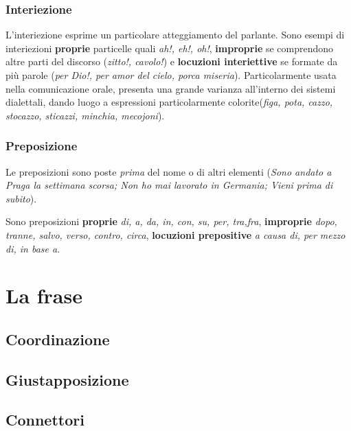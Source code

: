 \documentclass[a4paper,twoside,11pt,chapterprefix=false,bibliography=totocnumbered,listof=flat]{scrbook}
\begin{document}
\hypertarget{interiezione}{%
\subsection{Interiezione}\label{interiezione}}

L'interiezione esprime un particolare atteggiamento del parlante. Sono
esempi di interiezioni \textbf{proprie} particelle quali \emph{ah!, eh!,
oh!}, \textbf{improprie} se comprendono altre parti del discorso
(\emph{zitto!, cavolo!}) e \textbf{locuzioni interiettive} se formate da
più parole (\emph{per Dio!, per amor del cielo, porca miseria}).
Particolarmente usata nella comunicazione orale, presenta una grande
varianza all'interno dei sistemi dialettali, dando luogo a espressioni
particolarmente colorite(\emph{figa, pota, cazzo, stocazzo, sticazzi,
minchia, mecojoni}).

\hypertarget{preposizione}{%
\subsection{Preposizione}\label{preposizione}}

Le preposizioni sono poste \emph{prima} del nome o di altri elementi
(\emph{Sono andato a Praga la settimana scorsa; Non ho mai lavorato in
Germania; Vieni prima di subito}).

Sono preposizioni \textbf{proprie} \emph{di, a, da, in, con, su, per,
tra,fra}, \textbf{improprie} \emph{dopo, tranne, salvo, verso, contro,
circa}, \textbf{locuzioni prepositive} \emph{a causa di, per mezzo di,
in base a}.

\hypertarget{la-frase}{%
\chapter{La frase}\label{la-frase}}

\hypertarget{coordinazione}{%
\section{Coordinazione}\label{coordinazione}}

\hypertarget{giustapposizione}{%
\section{Giustapposizione}\label{giustapposizione}}

\hypertarget{connettori}{%
\section{Connettori}\label{connettori}}
\end{document}
